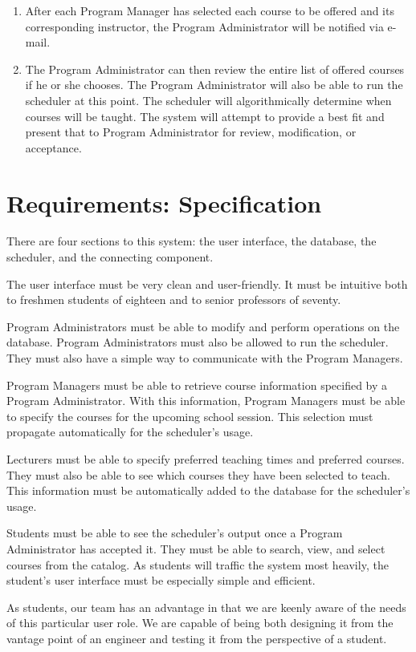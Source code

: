 \documentclass[12pt]{article}
\begin{document}
\begin{enumerate}
\item After each Program Manager has selected each course to be offered and its corresponding instructor, the Program Administrator will be notified via e-mail.
\item The Program Administrator can then review the entire list of offered courses if he or she chooses. The Program Administrator will also be able to run the scheduler at this point. The scheduler will algorithmically determine when courses will be taught. The system will attempt to provide a best fit and present that to Program Administrator for review, modification, or acceptance.
\end{enumerate}

\section{Requirements: Specification} %
There are four sections to this system: the user interface, the database, the scheduler, and the connecting component. 

The user interface must be very clean and user-friendly. It must be intuitive both to freshmen students of eighteen and to senior professors of seventy.  

Program Administrators must be able to modify and perform operations on the database. Program Administrators must also be allowed to run the scheduler. They must also have a simple way to communicate with the Program Managers. 

Program Managers must be able to retrieve course information specified by a Program Administrator.  With this information, Program Managers must be able to specify the courses for the upcoming school session. This selection must propagate automatically for the scheduler's usage.

Lecturers must be able to specify preferred teaching times and preferred courses. They must also be able to see which courses they have been selected to teach. This information must be automatically added to the database for the scheduler's usage.

Students must be able to see the scheduler's output once a Program Administrator has accepted it. They must be able to search, view, and select courses from the catalog. As students will traffic the system most heavily, the student's user interface must be especially simple and efficient. 

As students, our team has an advantage in that we are keenly aware of the needs of this particular user role. We are capable of being both designing it from the vantage point of an engineer and testing it from the perspective of a student. 
\end{document}
